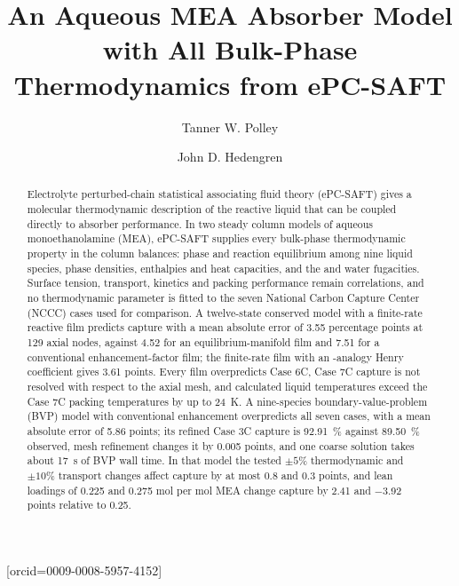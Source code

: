 \documentclass[a4paper,fleqn]{cas-sc}
\newcommand{\COtwo}{{\ce{CO2}}}
\newcommand{\NtwoO}{{\ce{N2O}}}
\begin{document}
    \def\floatpagepagefraction{1}
    \def\textpagefraction{.001}


    \title[mode = title]{An Aqueous MEA Absorber Model with All Bulk-Phase Thermodynamics from ePC-SAFT}

    \author[1]{Tanner W. Polley}[orcid=0009-0008-5957-4152]

    \author[1]{John D. Hedengren}
    \cormark[1]



    \begin{abstract}
Electrolyte perturbed-chain statistical associating fluid theory (ePC-SAFT) gives a molecular thermodynamic description of the reactive liquid that can be coupled directly to absorber performance.
In two steady column models of aqueous monoethanolamine (MEA), ePC-SAFT supplies every bulk-phase thermodynamic property in the column balances: phase and reaction equilibrium among nine liquid species, phase densities, enthalpies and heat capacities, and the \COtwo{} and water fugacities.
Surface tension, transport, kinetics and packing performance remain correlations, and no thermodynamic parameter is fitted to the seven National Carbon Capture Center (NCCC) cases used for comparison.
A twelve-state conserved model with a finite-rate reactive film predicts capture with a mean absolute error of \num{3.55} percentage points at 129 axial nodes, against \num{4.52} for an equilibrium-manifold film and \num{7.51} for a conventional enhancement-factor film; the finite-rate film with an \NtwoO{}-analogy Henry coefficient gives \num{3.61} points.
Every film overpredicts Case 6C, Case 7C capture is not resolved with respect to the axial mesh, and calculated liquid temperatures exceed the Case 7C packing temperatures by up to \qty{24}{K}.
A nine-species boundary-value-problem (BVP) model with conventional enhancement overpredicts all seven cases, with a mean absolute error of \num{5.86} points; its refined Case 3C capture is \qty{92.91}{\percent} against \qty{89.50}{\percent} observed, mesh refinement changes it by \num{0.005} points, and one coarse solution takes about \qty{17}{s} of BVP wall time.
In that model the tested \(\pm5\%\) thermodynamic and \(\pm10\%\) transport changes affect capture by at most \num{0.8} and \num{0.3} points, and lean loadings of 0.225 and 0.275 mol \COtwo{} per mol MEA change capture by \num{+2.41} and \num{-3.92} points relative to 0.25.
    \end{abstract}
\end{document}
